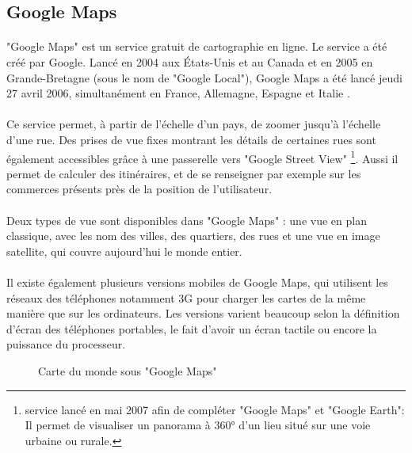 \subsection{Google Maps}
      \paragraph{}
	"Google Maps" est un service gratuit de cartographie en ligne. Le service a été créé par Google. 
	Lancé en 2004 aux États-Unis et au Canada et en 2005 en Grande-Bretagne (sous le nom de "Google Local"),
	Google Maps a été lancé jeudi 27 avril 2006, simultanément en France, Allemagne, Espagne et Italie \cite{T}.
      \paragraph{}
	Ce service permet, à partir de l'échelle d'un pays, de zoomer jusqu'à l'échelle d'une rue. Des prises 
	de vue fixes montrant les détails de certaines rues sont également accessibles grâce à une passerelle 
	vers "Google Street View" \footnote{ service lancé en mai 2007 afin de compléter "Google Maps" et "Google Earth": 
	Il permet de visualiser un panorama à 360° d'un lieu situé sur une voie urbaine ou rurale.}. Aussi il permet 
	de calculer des itinéraires, et de se renseigner par exemple sur les commerces 
	présents près de la position de l'utilisateur. 
      \paragraph{}
	Deux types de vue sont disponibles dans "Google Maps" : une vue en plan classique, avec les nom des villes, 
	des quartiers, des rues et une vue en image satellite, qui couvre aujourd'hui le monde entier.
      \paragraph{}
	Il existe également plusieurs versions mobiles de Google Maps, qui utilisent les réseaux des téléphones 
	notamment 3G pour charger les cartes de la même manière que sur les ordinateurs. Les versions varient 
	beaucoup selon la définition d'écran des téléphones portables, le fait d'avoir un écran tactile ou encore
	la puissance du processeur.
	
	  \begin{figure}[H]
	   \begin{center}
	    \caption[Carte du monde sous "Google Maps"]{Carte du monde sous "Google Maps" \protect \footnotemark}
	    \label{Carte du monde sous Google Maps}
	   \end{center}
	  \end{figure}

